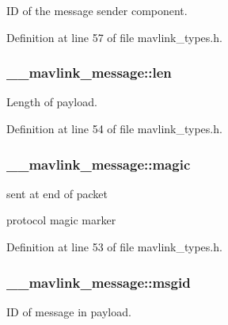 I\-D of the message sender component. 



Definition at line 57 of file mavlink\-\_\-types.\-h.

\hypertarget{struct____mavlink__message_a6a405c678e4b9fe57e5e621c5bcd4841}{
\subsubsection[{len}]{ \-\_\-\-\_\-mavlink\-\_\-message\-::len}}\label{struct____mavlink__message_a6a405c678e4b9fe57e5e621c5bcd4841}


Length of payload. 



Definition at line 54 of file mavlink\-\_\-types.\-h.

\hypertarget{struct____mavlink__message_a2e6ee9d46821aea33a08231dea000355}{
\subsubsection[{magic}]{ \-\_\-\-\_\-mavlink\-\_\-message\-::magic}}\label{struct____mavlink__message_a2e6ee9d46821aea33a08231dea000355}


sent at end of packet 

protocol magic marker 

Definition at line 53 of file mavlink\-\_\-types.\-h.

\hypertarget{struct____mavlink__message_a8d95b61c61b9086bada158104828d593}{
\subsubsection[{msgid}]{ \-\_\-\-\_\-mavlink\-\_\-message\-::msgid}}\label{struct____mavlink__message_a8d95b61c61b9086bada158104828d593}


I\-D of message in payload. 



